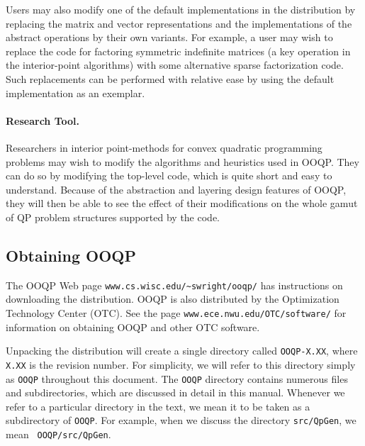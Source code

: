 Users may also modify one of the default implementations in the
distribution by replacing the matrix and vector representations and
the implementations of the abstract operations by their own
variants. For example, a user may wish to replace the code for
factoring symmetric indefinite matrices (a key operation in the
interior-point algorithms) with some alternative sparse factorization
code. Such replacements can be performed with relative ease by using
the default implementation as an exemplar.

\paragraph{Research Tool.}

Researchers in interior point-methods for convex quadratic programming
problems may wish to modify the algorithms and heuristics used in
OOQP. They can do so by modifying the top-level code, which is quite
short and easy to understand. Because of the abstraction and layering
design features of OOQP, they will then be able to see the effect of
their modifications on the whole gamut of QP problem structures
supported by the code.

\subsection{Obtaining OOQP}

The OOQP Web page \verb-www.cs.wisc.edu/~swright/ooqp/- has
instructions on downloading the distribution.
OOQP is also distributed by the Optimization Technology Center
(OTC). See the page {\tt www.ece.nwu.edu/OTC/software/} for
information on obtaining OOQP and other OTC software.

Unpacking the distribution will create a single directory called
\texttt{OOQP-X.XX}, where \texttt{X.XX} is the revision number. For
simplicity, we will refer to this directory simply as \texttt{OOQP}
throughout this document. The \texttt{OOQP} directory contains
numerous files and subdirectories, which are discussed in detail in
this manual. Whenever we refer to a particular directory in the text,
we mean it to be taken as a subdirectory of {\tt OOQP}. For example,
when we discuss the directory {\tt src/QpGen}, we mean {\tt
OOQP/src/QpGen}.

% 

